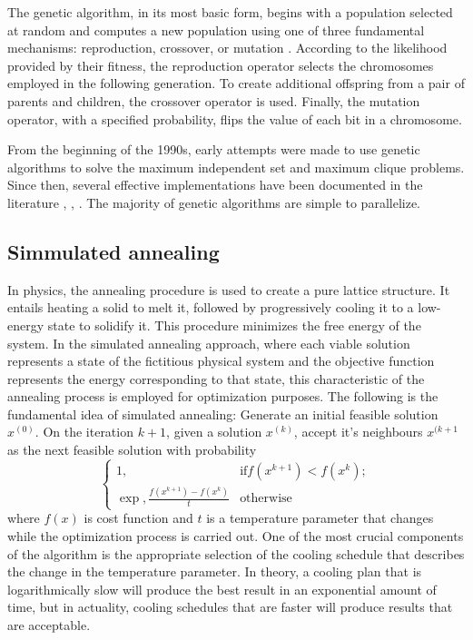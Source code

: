 The genetic algorithm, in its most basic form, begins with a population selected at random and computes a new population using one of three fundamental mechanisms: reproduction, crossover, or mutation \cite{g89}. According to the likelihood provided by their fitness, the reproduction operator selects the chromosomes employed in the following generation. To create additional offspring from a pair of parents and children, the crossover operator is used. Finally, the mutation operator, with a specified probability, flips the value of each bit in a chromosome.

From the beginning of the 1990s, early attempts were made to use genetic algorithms to solve the maximum independent set and maximum clique problems. Since then, several effective implementations have been documented in the literature \cite{be95}, \cite{h97}, \cite{m02}. The majority of genetic algorithms are simple to parallelize.

\subsection{Simmulated annealing}

In physics, the annealing procedure is used to create a pure lattice structure. It entails heating a solid to melt it, followed by progressively cooling it to a low-energy state to solidify it. This procedure minimizes the free energy of the system. In the simulated annealing approach, where each viable solution represents a state of the fictitious physical system and the objective function represents the energy corresponding to that state, this characteristic of the annealing process is employed for optimization purposes. The following is the fundamental idea of simulated annealing:
Generate an initial feasible solution $x^{(0)}$. On the iteration $k+1$, given a solution $x^{(k)}$, accept it's neighbours $x^{(k+1}$ as the next feasible solution with probability
\begin{equation}
   \begin{cases}
      1, & \text{if} f(x^{k+1}) < f(x^k);\\
      \exp, \frac{f(x^{k+1})-f(x^k)}{t} & \text{otherwise}
    \end{cases}  
\end{equation}
where $f(x)$ is cost function and $t$ is a temperature parameter that changes while the optimization process is carried out. One of the most crucial components of the algorithm is the appropriate selection of the cooling schedule that describes the change in the temperature parameter. In theory, a cooling plan that is logarithmically slow will produce the best result in an exponential amount of time, but in actuality, cooling schedules that are faster will produce results that are acceptable.

